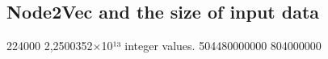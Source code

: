 \subsection{Node2Vec and the size of input data}\label{AP:N2V}
224000
2,2500352×10¹³ integer values.
504480000000
804000000
